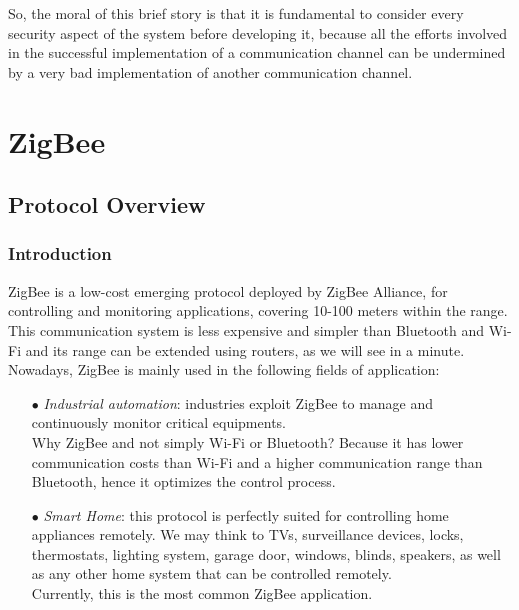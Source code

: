 \documentclass[12pt]{report}
\begin{document}
{So, the moral of this brief story is that it is fundamental to consider every security aspect of the system before developing it, because all the efforts involved in the successful implementation of a communication channel can be undermined by a very bad implementation of another communication channel.\\


\part{ZigBee}

\chapter{Protocol Overview}

\section{Introduction}
\bigskip

ZigBee is a low-cost emerging protocol deployed by ZigBee Alliance, for controlling and monitoring applications, covering 10-100 meters within the range. \\
This communication system is less expensive and simpler than Bluetooth and Wi-Fi and its range can be extended using routers, as we will see in a minute.\\

Nowadays, ZigBee is mainly used in the following fields of application:
\begin{itemize}
\setlength{\itemindent}{+4mm}
\item[$\bullet$] \emph{Industrial automation}: industries exploit ZigBee to manage and continuously monitor critical equipments.\\
Why ZigBee and not simply Wi-Fi or Bluetooth? Because it has lower communication costs than Wi-Fi and a higher communication range than Bluetooth, hence it optimizes the control process.
\item[$\bullet$] \emph{Smart Home}: this protocol is perfectly suited for controlling home appliances remotely. We may think to TVs, surveillance devices, locks, thermostats, lighting system, garage door, windows, blinds, speakers, as well as any other home system that can be controlled remotely.\\
Currently, this is the most common ZigBee application.\\

\end{itemize}

}
\end{document}
